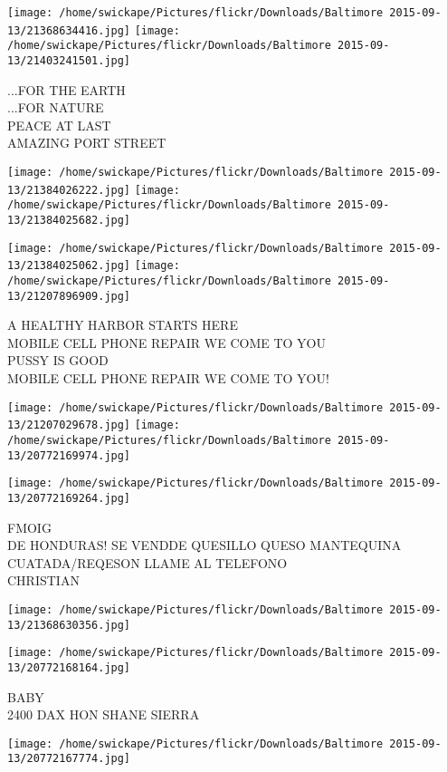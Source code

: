 \documentclass[10pt,letterpaper]{article}
\begin{document}
\texttt{[image: /home/swickape/Pictures/flickr/Downloads/Baltimore 2015-09-13/21368634416.jpg]}
\texttt{[image: /home/swickape/Pictures/flickr/Downloads/Baltimore 2015-09-13/21403241501.jpg]}

...FOR THE EARTH\\
...FOR NATURE\\
PEACE AT LAST\\
AMAZING PORT STREET
\pagebreak

\texttt{[image: /home/swickape/Pictures/flickr/Downloads/Baltimore 2015-09-13/21384026222.jpg]}
\texttt{[image: /home/swickape/Pictures/flickr/Downloads/Baltimore 2015-09-13/21384025682.jpg]}

\texttt{[image: /home/swickape/Pictures/flickr/Downloads/Baltimore 2015-09-13/21384025062.jpg]}
\texttt{[image: /home/swickape/Pictures/flickr/Downloads/Baltimore 2015-09-13/21207896909.jpg]}

A HEALTHY HARBOR STARTS HERE\\
MOBILE CELL PHONE REPAIR WE COME TO YOU\\
PUSSY IS GOOD\\
MOBILE CELL PHONE REPAIR WE COME TO YOU!
\pagebreak

\texttt{[image: /home/swickape/Pictures/flickr/Downloads/Baltimore 2015-09-13/21207029678.jpg]}
\texttt{[image: /home/swickape/Pictures/flickr/Downloads/Baltimore 2015-09-13/20772169974.jpg]}

\vspace{0.25in}
\texttt{[image: /home/swickape/Pictures/flickr/Downloads/Baltimore 2015-09-13/20772169264.jpg]}

FMOIG\\
DE HONDURAS!  SE VENDDE QUESILLO QUESO MANTEQUINA CUATADA/REQESON LLAME AL TELEFONO\\
CHRISTIAN
\pagebreak

\texttt{[image: /home/swickape/Pictures/flickr/Downloads/Baltimore 2015-09-13/21368630356.jpg]}

\vspace{0.25in}
\texttt{[image: /home/swickape/Pictures/flickr/Downloads/Baltimore 2015-09-13/20772168164.jpg]}

BABY\\
2400 DAX HON SHANE SIERRA
\pagebreak

\texttt{[image: /home/swickape/Pictures/flickr/Downloads/Baltimore 2015-09-13/20772167774.jpg]}
\end{document}
